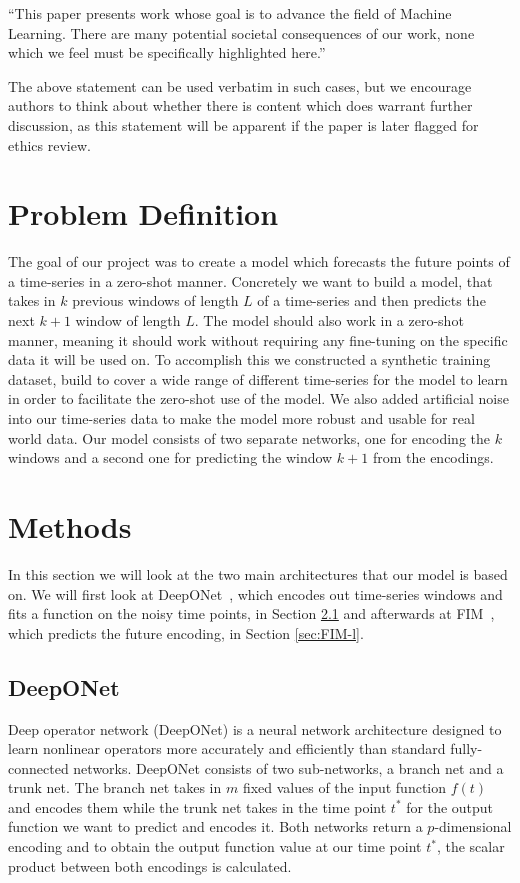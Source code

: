 \documentclass{article}
\theoremstyle{plain}
\theoremstyle{definition}
\theoremstyle{remark}
\begin{document}
``This paper presents work whose goal is to advance the field of 
Machine Learning. There are many potential societal consequences 
of our work, none which we feel must be specifically highlighted here.''

The above statement can be used verbatim in such cases, but we 
encourage authors to think about whether there is content which does 
warrant further discussion, as this statement will be apparent if the 
paper is later flagged for ethics review.

\section{Problem Definition}
The goal of our project was to create a model which forecasts the future points of a time-series in a zero-shot manner. Concretely we want to build a model, that takes in $k$ previous windows of length $L$ of a time-series and then predicts the next $k+1$ window of length $L$. The model should also work in a zero-shot manner, meaning it should work without requiring any fine-tuning on the specific data it will be used on. To accomplish this we constructed a synthetic training dataset, build to cover a wide range of different time-series for the model to learn in order to facilitate the zero-shot use of the model. We also added artificial noise into our time-series data to make the model more robust and usable for real world data. Our model consists  of two separate networks, one for encoding the $k$ windows and a second one for predicting the window $k+1$ from the encodings. 

\section{Methods}
In this section we will look at the two main architectures that our model is based on. We will first look at DeepONet~\cite{Deeponet}, which encodes out time-series windows and fits a function on the noisy time points, in Section \ref{sec:DeepONet} and afterwards at FIM~\cite{fim-l}, which predicts the future encoding, in Section \ref{sec:FIM-l}.

\subsection{DeepONet}\label{sec:DeepONet}
Deep operator network (DeepONet)\cite{Deeponet} is a neural network architecture designed to learn nonlinear operators more accurately and efficiently than standard fully-connected networks. DeepONet consists of two sub-networks, a branch net and a trunk net. The branch net takes in $m$ fixed values of the input function $f(t)$ and encodes them while the trunk net takes in the time point $t^*$ for the output function we want to predict and encodes it. Both networks return a $p$-dimensional encoding and to obtain the output function value at our time point $t^*$, the scalar product between both encodings is calculated.
\end{document}
